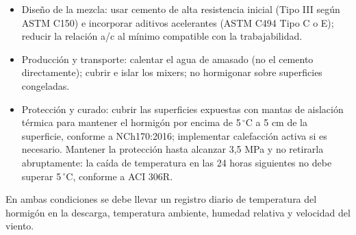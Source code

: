 \begin{itemize}
    \item Diseño de la mezcla: usar cemento de alta resistencia inicial (Tipo III según ASTM C150) e incorporar aditivos acelerantes (ASTM C494 Tipo C o E); reducir la relación a/c al mínimo compatible con la trabajabilidad.
    \item Producción y transporte: calentar el agua de amasado (no el cemento directamente); cubrir e islar los mixers; no hormigonar sobre superficies congeladas.
    \item Protección y curado: cubrir las superficies expuestas con mantas de aislación térmica para mantener el hormigón por encima de 5\,$^\circ$C a 5 cm de la superficie, conforme a NCh170:2016; implementar calefacción activa si es necesario. Mantener la protección hasta alcanzar 3,5 MPa y no retirarla abruptamente: la caída de temperatura en las 24 horas siguientes no debe superar 5\,$^\circ$C, conforme a ACI 306R.
\end{itemize}

En ambas condiciones se debe llevar un registro diario de temperatura del hormigón en la descarga, temperatura ambiente, humedad relativa y velocidad del viento.
